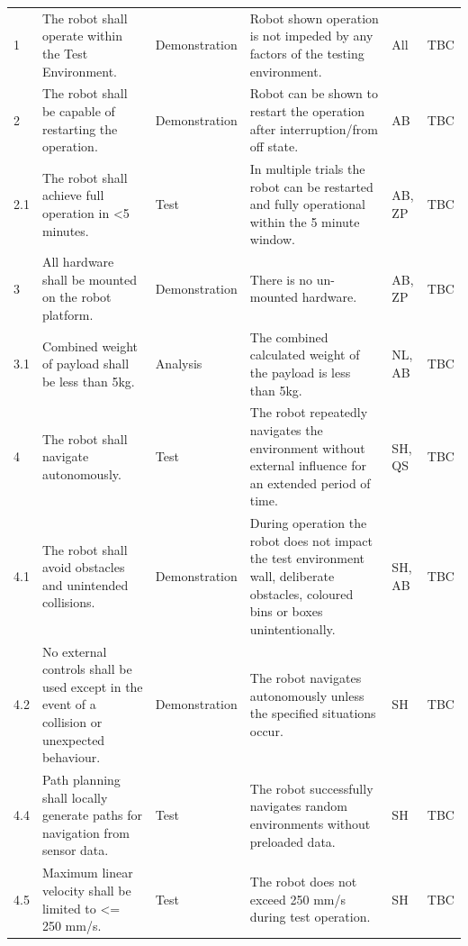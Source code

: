 \begin{landscape}
\begin{longtable}{@{}R{1.2cm} R{9.5cm} R{3.5cm} R{4.0cm} R{3.0cm} R{1.0cm}@{}}
\endlastfoot

1 & The robot shall operate within the Test Environment. & Demonstration & Robot shown operation is not impeded by any factors of the testing environment. & All & TBC \\[4pt]

2 & The robot shall be capable of restarting the operation. & Demonstration & Robot can be shown to restart the operation after interruption/from off state. & AB & TBC \\[4pt]

2.1 & The robot shall achieve full operation in <5 minutes. & Test & In multiple trials the robot can be restarted and fully operational within the 5 minute window. & AB, ZP & TBC \\[4pt]

3 & All hardware shall be mounted on the robot platform. & Demonstration & There is no un-mounted hardware. & AB, ZP & TBC \\[4pt]

3.1 & Combined weight of payload shall be less than 5kg. & Analysis & The combined calculated weight of the payload is less than 5kg. & NL, AB & TBC \\[4pt]

4 & The robot shall navigate autonomously. & Test & The robot repeatedly navigates the environment without external influence for an extended period of time. & SH, QS & TBC \\[4pt]

4.1 & The robot shall avoid obstacles and unintended collisions. & Demonstration & During operation the robot does not impact the test environment wall, deliberate obstacles, coloured bins or boxes unintentionally. & SH, AB & TBC \\[4pt]

4.2 & No external controls shall be used except in the event of a collision or unexpected behaviour. & Demonstration & The robot navigates autonomously unless the specified situations occur. & SH & TBC \\[4pt]

4.4 & Path planning shall locally generate paths for navigation from sensor data. & Test & The robot successfully navigates random environments without preloaded data. & SH & TBC \\[4pt]

4.5 & Maximum linear velocity shall be limited to <= 250 mm/s. & Test & The robot does not exceed 250 mm/s during test operation. & SH & TBC \\[4pt]


\end{longtable}
\end{landscape}
